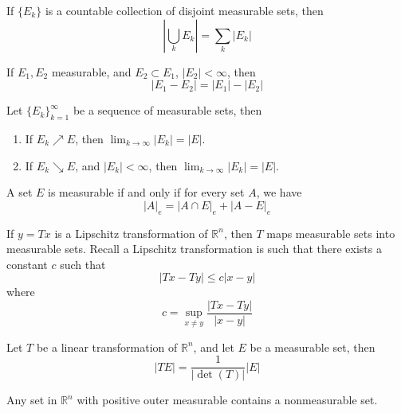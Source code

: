 \documentclass[openany]{book}
\newcommand{\R}{\mathbb{R}}
\begin{document}
\begin{thm}
    If $\{E_k\}$ is a countable collection of disjoint measurable sets, then 
    \begin{equation*}
        \left|\bigcup_kE_k\right|=\sum_k|E_k|
    \end{equation*}
\end{thm}
\begin{prop}
    If $E_1,E_2$ measurable, and $E_2\subset E_1$, $|E_2|<\infty$, then 
    \begin{equation*}
        |E_1-E_2|=|E_1|-|E_2|
    \end{equation*}
\end{prop}
\begin{thm}
    Let $\{E_k\}_{k=1}^\infty$ be a sequence of measurable sets, then 
    \begin{enumerate}
        \item If $E_k\nearrow E$, then $\lim_{k\to\infty}|E_k|=|E|$.
        \item If $E_k\searrow E$, and $|E_k|<\infty$, then $\lim_{k\to\infty}|E_k|=|E|$.
    \end{enumerate}
\end{thm}
\begin{thm}[Caratheodory]
    A set $E$ is measurable if and only if for every set $A$, we have 
    \begin{equation*}
        |A|_e=|A\cap E|_e+|A-E|_e
    \end{equation*}
\end{thm}
\begin{thm}
    If $y=Tx$ is a Lipschitz transformation of $\R^n$, then $T$ maps measurable sets into measurable sets. Recall a Lipschitz transformation is such that there exists a constant $c$ such that 
    \begin{equation*}
        |Tx-Ty|\leq c|x-y|
    \end{equation*}
    where 
    \begin{equation*}
        c=\sup_{x\neq y}\frac{|Tx-Ty|}{|x-y|}
    \end{equation*}
\end{thm}
\begin{thm}
    Let $T$ be a linear transformation of $\R^n$, and let $E$ be a measurable set, then 
    \begin{equation*}
        |TE|=\frac{1}{|\det(T)|}|E|
    \end{equation*}
\end{thm}
\begin{prop}
    Any set in $\R^n$ with positive outer measurable contains a nonmeasurable set.
\end{prop}
\end{document}
